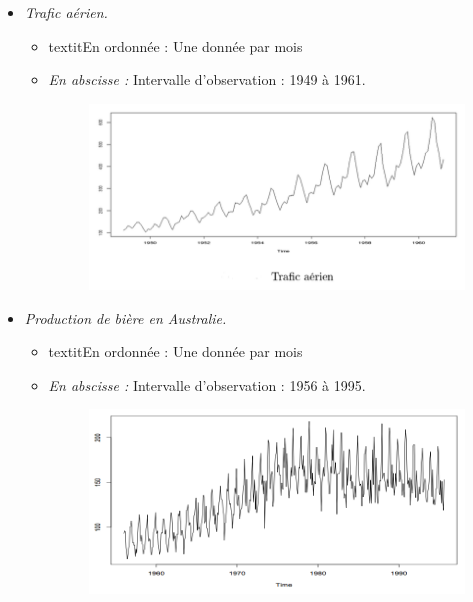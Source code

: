 \begin{itemize}
\begin{itemize}
\end{itemize}
\item \textit{Trafic aérien.}
\begin{itemize}
\item textit{En ordonnée :} Une donnée par mois
\item \textit{En abscisse :} Intervalle d'observation : 1949 à 1961.
\begin{figure}[H]\begin{center}\includegraphics[scale=0.5]{ilu/ccm23.png}\end{center}\end{figure}
\end{itemize}

\item \textit{Production de bière en Australie.}
\begin{itemize}
\item textit{En ordonnée :} Une donnée par mois
\item \textit{En abscisse :} Intervalle d'observation : 1956 à 1995.
\begin{figure}[H]\begin{center}\includegraphics[scale=0.5]{ilu/ccm24.png}\end{center}\end{figure}
\end{itemize}


\end{itemize}
